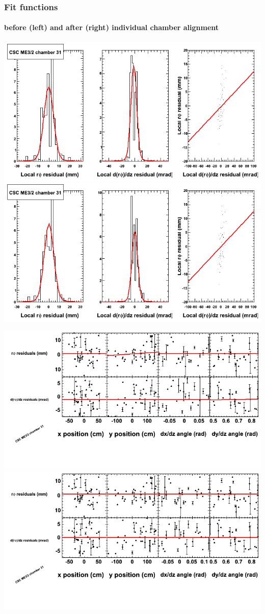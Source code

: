 \documentclass[compress]{beamer}
\begin{document}
\begin{frame}
\frametitle{Fit functions}
\framesubtitle{before (left) and after (right) individual chamber alignment}
\includegraphics[width=0.5\linewidth]{ringfits_3dof/beforefit_MEp32_31_bellcurve.png} \includegraphics[width=0.5\linewidth]{ringfits_3dof/afterfit_MEp32_31_bellcurve.png}

\includegraphics[width=0.5\linewidth]{ringfits_3dof/beforefit_MEp32_31_polynomials.png} \includegraphics[width=0.5\linewidth]{ringfits_3dof/afterfit_MEp32_31_polynomials.png}
\end{frame}
\end{document}

